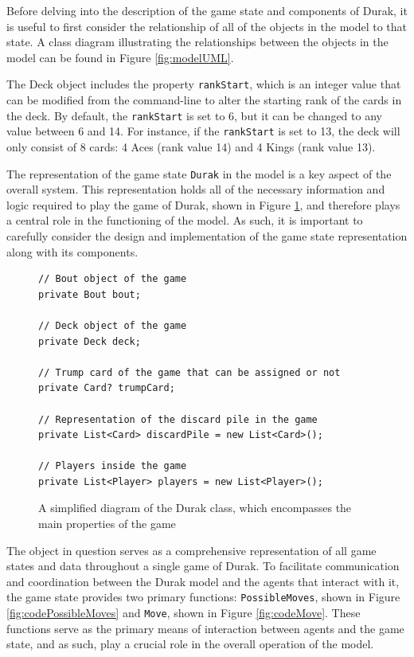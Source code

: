 Before delving into the description of the game state and components of Durak, it is useful to first consider the relationship of all of the objects in the model to that state. A class diagram illustrating the relationships between the objects in the model can be found in Figure \ref{fig:modelUML}.

The Deck object includes the property \texttt{rankStart}, which is an integer value that can be modified from the command-line to alter the starting rank of the cards in the deck. By default, the \texttt{rankStart} is set to 6, but it can be changed to any value between 6 and 14. For instance, if the \texttt{rankStart} is set to 13, the deck will only consist of 8 cards: 4 Aces (rank value 14) and 4 Kings (rank value 13). 

The representation of the game state \texttt{Durak} in the model is a key aspect of the overall system. This representation holds all of the necessary information and logic required to play the game of Durak, shown in Figure \ref{fig:codeDurak}, and therefore plays a central role in the functioning of the model. As such, it is important to carefully consider the design and implementation of the game state representation along with its components. 

\begin{figure}[h]
\captionsetup{justification=centering}
\begin{lstlisting}
// Bout object of the game
private Bout bout;

// Deck object of the game
private Deck deck;

// Trump card of the game that can be assigned or not
private Card? trumpCard;

// Representation of the discard pile in the game
private List<Card> discardPile = new List<Card>();

// Players inside the game
private List<Player> players = new List<Player>();

\end{lstlisting}
\caption{A simplified diagram of the Durak class, which encompasses the main properties of the game}
\label{fig:codeDurak}
\end{figure}

The object in question serves as a comprehensive representation of all game states and data throughout a single game of Durak. To facilitate communication and coordination between the Durak model and the agents that interact with it, the game state provides two primary functions: \texttt{PossibleMoves}, shown in Figure \ref{fig:codePossibleMoves} and \texttt{Move}, shown in Figure \ref{fig:codeMove}. These functions serve as the primary means of interaction between agents and the game state, and as such, play a crucial role in the overall operation of the model. 

